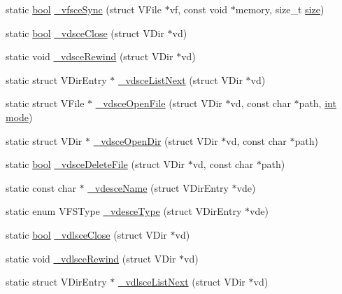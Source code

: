 \begin{DoxyCompactItemize}
\item 
static \mbox{\hyperlink{libretro_8h_a4a26dcae73fb7e1528214a068aca317e}{bool}} \mbox{\hyperlink{sce-vfs_8c_a2e5832acdb13477bec265326bc727547}{\+\_\+vfsce\+Sync}} (struct V\+File $\ast$vf, const void $\ast$memory, size\+\_\+t \mbox{\hyperlink{ioapi_8h_a014d89bd76f74ef3a29c8f04b473eb76}{size}})
\item 
static \mbox{\hyperlink{libretro_8h_a4a26dcae73fb7e1528214a068aca317e}{bool}} \mbox{\hyperlink{sce-vfs_8c_a0117395ca30b8792363d78449fe61630}{\+\_\+vdsce\+Close}} (struct V\+Dir $\ast$vd)
\item 
static void \mbox{\hyperlink{sce-vfs_8c_ae01bdb9e8b8c74de0990706d0d71efb7}{\+\_\+vdsce\+Rewind}} (struct V\+Dir $\ast$vd)
\item 
static struct V\+Dir\+Entry $\ast$ \mbox{\hyperlink{sce-vfs_8c_a57e973c17c5a3b2598161d56e3f778e3}{\+\_\+vdsce\+List\+Next}} (struct V\+Dir $\ast$vd)
\item 
static struct V\+File $\ast$ \mbox{\hyperlink{sce-vfs_8c_aa6c4428f224691c2646883dde2b7936d}{\+\_\+vdsce\+Open\+File}} (struct V\+Dir $\ast$vd, const char $\ast$path, \mbox{\hyperlink{ioapi_8h_a787fa3cf048117ba7123753c1e74fcd6}{int}} \mbox{\hyperlink{ioapi_8h_a7e43d41c2fe013a373b540cba02505cf}{mode}})
\item 
static struct V\+Dir $\ast$ \mbox{\hyperlink{sce-vfs_8c_a7b060e37958afd93372f841b613595a2}{\+\_\+vdsce\+Open\+Dir}} (struct V\+Dir $\ast$vd, const char $\ast$path)
\item 
static \mbox{\hyperlink{libretro_8h_a4a26dcae73fb7e1528214a068aca317e}{bool}} \mbox{\hyperlink{sce-vfs_8c_aaceb97860f376368fc9ba409a19ede70}{\+\_\+vdsce\+Delete\+File}} (struct V\+Dir $\ast$vd, const char $\ast$path)
\item 
static const char $\ast$ \mbox{\hyperlink{sce-vfs_8c_a5e00b5ef51581ac1d41852c7f060a079}{\+\_\+vdesce\+Name}} (struct V\+Dir\+Entry $\ast$vde)
\item 
static enum V\+F\+S\+Type \mbox{\hyperlink{sce-vfs_8c_a81d276ea328a06eb57ab98160bfb6713}{\+\_\+vdesce\+Type}} (struct V\+Dir\+Entry $\ast$vde)
\item 
static \mbox{\hyperlink{libretro_8h_a4a26dcae73fb7e1528214a068aca317e}{bool}} \mbox{\hyperlink{sce-vfs_8c_ab25e52aef2dda5c0b7a37e497275d1aa}{\+\_\+vdlsce\+Close}} (struct V\+Dir $\ast$vd)
\item 
static void \mbox{\hyperlink{sce-vfs_8c_aa32b8d06f036ca56f6882ea277681784}{\+\_\+vdlsce\+Rewind}} (struct V\+Dir $\ast$vd)
\item 
static struct V\+Dir\+Entry $\ast$ \mbox{\hyperlink{sce-vfs_8c_a645e5c55b04d294bac527dc0384a573b}{\+\_\+vdlsce\+List\+Next}} (struct V\+Dir $\ast$vd)

\end{DoxyCompactItemize}
